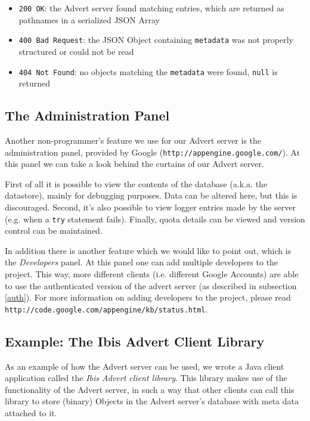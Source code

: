 \begin{itemize}
  \item \texttt{200 OK}: the Advert server found matching entries, which are
  returned as pathnames in a serialized JSON Array
  \item \texttt{400 Bad Request}: the JSON Object containing \texttt{metadata}
  was not properly structured or could not be read
  \item \texttt{404 Not Found}: no objects matching the \texttt{metadata} were
  found, \texttt{null} is returned
\end{itemize}

\subsection{The Administration Panel}
\label{admin-panel}
Another non-programmer's feature we use for our Advert server is the
administration panel, provided by Google (\texttt{http://appengine.google.com/}).
At this panel we can take a look behind the curtains of our Advert server.

First of all it is possible to view the contents of the database (a.k.a. the
datastore), mainly for debugging purposes. Data can be altered here, but this
is discouraged. Second, it's also possible to view logger entries made by the
server (e.g. when a \texttt{try} statement fails). Finally, quota details can
be viewed and version control can be maintained.

In addition there is another feature which we would like to point out, which is
the \emph{Developers} panel. At this panel one can add multiple developers to
the project. This way, more different clients (i.e. different Google Accounts)
are able to use the authenticated version of the advert server (as described in
subsection \ref{auth}). For more information on adding developers to the project,
please read \texttt{http://code.google.com/appengine/kb/status.html}.

\subsection{Example: The Ibis Advert Client Library}
\label{advert-lib}
As an example of how the Advert server can be used, we wrote a Java client
application called the \emph{Ibis Advert client library}. This library makes use
of the functionality of the Advert server, in such a way that other clients can
call this library to store (binary) Objects in the Advert server's database
with meta data attached to it.

